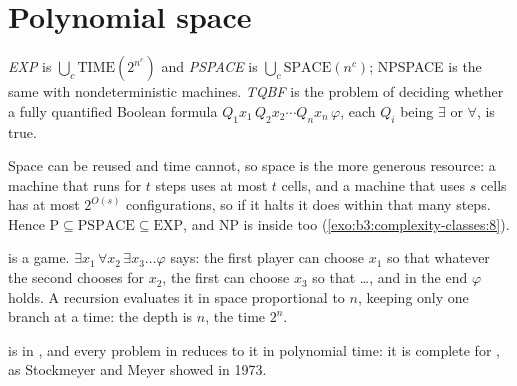 \section{Polynomial space}\label{sec:b3:complexity-classes:space}

\begin{definition}\label{def:b3:complexity-classes:pspace}
\emph{EXP} is $\bigcup_c \mathrm{TIME}(2^{n^c})$ and \emph{PSPACE} is $\bigcup_c \mathrm{SPACE}(n^c)$; NPSPACE is the same with nondeterministic machines. \emph{TQBF} is the problem of deciding whether a fully quantified Boolean formula $Q_1 x_1\, Q_2 x_2 \cdots Q_n x_n\, \varphi$, each $Q_i$ being $\exists$ or $\forall$, is true.
\end{definition}

Space can be reused and time cannot, so space is the more generous resource: a machine that runs for $t$ steps uses at most $t$ cells, and a machine that uses $s$ cells has at most $2^{O(s)}$ configurations, so if it halts it does within that many steps. Hence $\mathrm{P} \subseteq \mathrm{PSPACE} \subseteq \mathrm{EXP}$, and NP is inside  too (\cref{exo:b3:complexity-classes:8}).

 is a game. $\exists x_1\, \forall x_2\, \exists x_3 \ldots \varphi$ says: the first player can choose $x_1$ so that whatever the second chooses for $x_2$, the first can choose $x_3$ so that \dots, and in the end $\varphi$ holds. A recursion evaluates it in space proportional to $n$, keeping only one branch at a time: the depth is $n$, the time $2^n$.

\label{lst:b3:complexity-classes:qbf}

\label{out:b3:complexity-classes:qbf}

 is in , and every problem in  reduces to it in polynomial time: it is complete for , as Stockmeyer and Meyer showed in 1973. %

